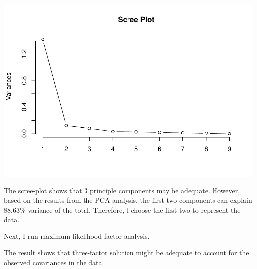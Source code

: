 \documentclass[
]{article}
\newenvironment{Shaded}{\begin{snugshade}}{\end{snugshade}}
\newcommand{\AttributeTok}[1]{\textcolor[rgb]{0.77,0.63,0.00}{#1}}
\newcommand{\CommentTok}[1]{\textcolor[rgb]{0.56,0.35,0.01}{\textit{#1}}}
\newcommand{\ControlFlowTok}[1]{\textcolor[rgb]{0.13,0.29,0.53}{\textbf{#1}}}
\newcommand{\DecValTok}[1]{\textcolor[rgb]{0.00,0.00,0.81}{#1}}
\newcommand{\ErrorTok}[1]{\textcolor[rgb]{0.64,0.00,0.00}{\textbf{#1}}}
\newcommand{\FloatTok}[1]{\textcolor[rgb]{0.00,0.00,0.81}{#1}}
\newcommand{\FunctionTok}[1]{\textcolor[rgb]{0.00,0.00,0.00}{#1}}
\newcommand{\NormalTok}[1]{#1}
\newcommand{\SpecialCharTok}[1]{\textcolor[rgb]{0.00,0.00,0.00}{#1}}
\newcommand{\StringTok}[1]{\textcolor[rgb]{0.31,0.60,0.02}{#1}}
\begin{document}
\includegraphics[width=0.5\linewidth,height=0.75\textheight]{HUDM6122-Homework_05-Chenguang-Pan_files/figure-latex/unnamed-chunk-14-1}

The scree-plot shows that 3 principle components may be adequate.
However, based on the results from the PCA analysis, the first two
components can explain 88.63\% variance of the total. Therefore, I
choose the first two to represent the data.

Next, I run maximum likelihood factor analysis.

\begin{Shaded}
\end{Shaded}

The result shows that three-factor solution might be adequate to account
for the observed covariances in the data.
\end{document}
